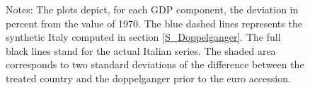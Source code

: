\documentclass[12pt]{article}
\newcommand{\annote}[1]{\parbox{\textwidth}{\renewcommand{\baselinestretch}{1.0}\vspace{12pt} \small Notes: #1}}
\begin{document}
\begin{appendices}
\begin{figure}[h!]
    \annote{The plots depict, for each GDP component, the deviation in percent from the value of 1970. The blue dashed lines represents the synthetic Italy computed in section \ref{S_Doppelganger}. The full black lines stand for the actual Italian series. The shaded area corresponds to two standard deviations of the difference between the treated country and the doppelganger prior to the euro accession. }
\end{figure}


\end{appendices}
\end{document}
